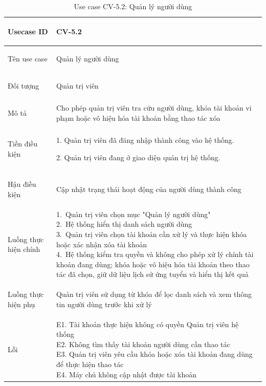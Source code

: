 \begin{table}[H]
    \centering
    \small
    \renewcommand{\arraystretch}{1.0}
    \begin{tabularx}{\textwidth}{|
        >{\bfseries\raggedright\arraybackslash}p{3.2cm}|Y|}
        \hline

        Usecase ID & CV-5.2 \\ \hline

        Tên use case & Quản lý người dùng \\ \hline

        Đối tượng & Quản trị viên \\ \hline

        Mô tả & Cho phép quản trị viên tra cứu người dùng, khóa tài khoản vi phạm hoặc vô hiệu hóa tài khoản bằng thao tác xóa \\ \hline

        Tiền điều kiện &
        \parbox[t]{\hsize}{
            1. Quản trị viên đã đăng nhập thành công vào hệ thống.\par
            2. Quản trị viên đang ở giao diện quản trị hệ thống.
        } \\
        \hline

        Hậu điều kiện & Cập nhật trạng thái hoạt động của người dùng thành công \\ \hline

        Luồng thực hiện chính &
        \parbox[t]{\hsize}{
            1.\ Quản trị viên chọn mục "Quản lý người dùng"\\
            2.\ Hệ thống hiển thị danh sách người dùng\\
            3.\ Quản trị viên chọn tài khoản cần xử lý và thực hiện khóa hoặc xác nhận xóa tài khoản\\
            4.\ Hệ thống kiểm tra quyền và không cho phép xử lý chính tài khoản đang dùng; khóa hoặc vô hiệu hóa tài khoản theo thao tác đã chọn, giữ dữ liệu lịch sử ứng tuyển và hiển thị kết quả
        }\\
        \hline

        Luồng thực hiện phụ & Quản trị viên sử dụng từ khóa để lọc danh sách và xem thông tin người dùng trước khi xử lý \\
        \hline

        Lỗi &
        \parbox[t]{\hsize}{
            E1. Tài khoản thực hiện không có quyền Quản trị viên hệ thống\\
            E2. Không tìm thấy tài khoản người dùng cần thao tác\\
            E3. Quản trị viên yêu cầu khóa hoặc xóa tài khoản đang dùng để thực hiện thao tác\\
            E4. Máy chủ không cập nhật được tài khoản
        }\\
        \hline

    \end{tabularx}

    \caption{Use case CV-5.2: Quản lý người dùng}
    \label{tab:usecase-cv52}
\end{table}

